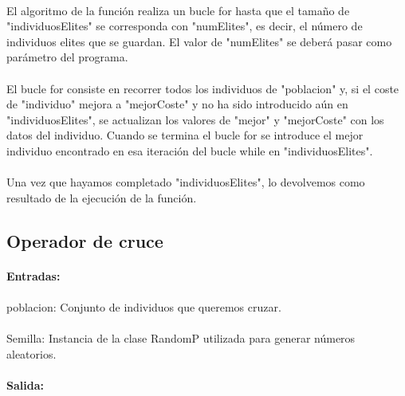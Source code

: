 	\paragraph{}El algoritmo de la función realiza un bucle for hasta que el tamaño de "individuosElites" se corresponda con "numElites", es decir, el número de individuos elites que se guardan. El valor de "numElites" se deberá pasar como parámetro del programa.
	
	\paragraph{}El bucle for consiste en recorrer todos los individuos de "poblacion" y, si el coste de "individuo" mejora a "mejorCoste" y no ha sido introducido aún en "individuosElites", se actualizan los valores de "mejor" y "mejorCoste" con los datos del individuo. Cuando se termina el bucle for se introduce el mejor individuo encontrado en esa iteración del bucle while en "individuosElites".
	
	\paragraph{}Una vez que hayamos completado "individuosElites", lo devolvemos como resultado de la ejecución de la función.
	
	\subsection{Operador de cruce}
	
	\paragraph{Entradas:}
	
	\paragraph{}poblacion: Conjunto de individuos que queremos cruzar.
	
	\paragraph{}Semilla: Instancia de la clase RandomP utilizada para generar números aleatorios.
	
	\paragraph{Salida:}
	
